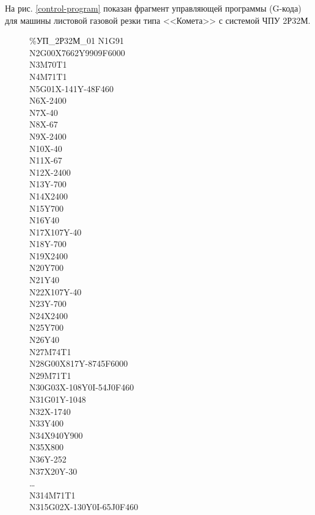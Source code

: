 \documentclass[11pt,twoside]{report}
\begin{document}
На рис. \ref{control-program} показан фрагмент управляющей программы
(G-кода) для машины листовой газовой резки
типа <<Комета>> с системой ЧПУ 2Р32М.

\begin{figure}
\begin{multicols}{3}

  \%УП\_2Р32М\_01
  N1G91 \\
  N2G00X7662Y9909F6000 \\
  N3M70T1 \\
  N4M71T1 \\
  N5G01X-141Y-48F460 \\
  N6X-2400  \\
  N7X-40  \\
  N8X-67  \\
  N9X-2400  \\
  N10X-40 \\
  N11X-67 \\
  N12X-2400 \\
  N13Y-700  \\
  N14X2400  \\
  N15Y700 \\
  N16Y40  \\
  N17X107Y-40 \\
  N18Y-700  \\
  N19X2400  \\
  N20Y700 \\
  N21Y40  \\
  N22X107Y-40 \\
  N23Y-700  \\
  N24X2400  \\
  N25Y700 \\
  N26Y40  \\
  N27M74T1  \\
  N28G00X817Y-8745F6000 \\
  N29M71T1  \\
  N30G03X-108Y0I-54J0F460 \\
  N31G01Y-1048  \\
  N32X-1740 \\
  N33Y400 \\
  N34X940Y900 \\
  N35X800 \\
  N36Y-252  \\
  N37X20Y-30  \\
  … \\
  N314M71T1 \\
  N315G02X-130Y0I-65J0F460  \\

\end{multicols}
\end{figure}
\end{document}
